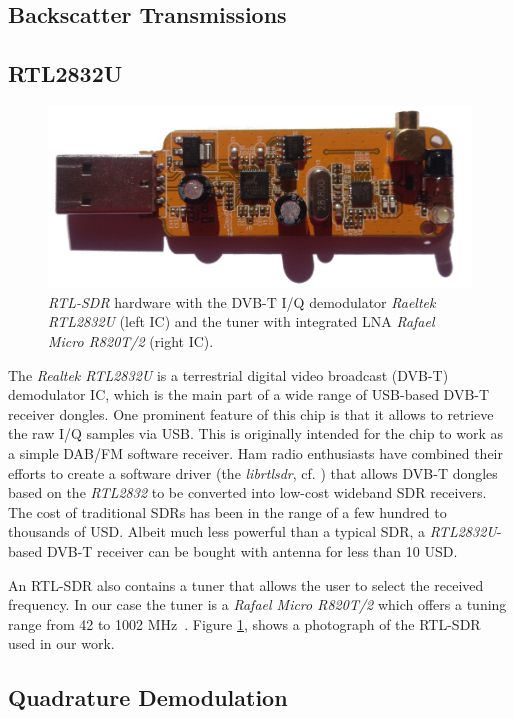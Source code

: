 \documentclass[conference]{IEEEtran}
\begin{document}
\subsection{Backscatter Transmissions}


\subsection{RTL2832U}
\label{sub:rtl2832}

\begin{figure}[h]
				\centering
				\includegraphics[width=0.5\columnwidth]{./fig/rtlsdr.jpg}
				\caption{\textit{RTL-SDR} hardware with the DVB-T I/Q
				demodulator \textit{Raeltek RTL2832U} (left IC) and the tuner
				with integrated LNA \textit{Rafael Micro R820T/2} (right IC).} 
				\label{fig:receiver_arch}
\end{figure}
The \textit{Realtek RTL2832U} is a terrestrial digital video broadcast
(DVB-T) demodulator IC, which is the main part of a wide range of
USB-based DVB-T receiver dongles. One prominent feature of this chip is
that it allows to retrieve the raw I/Q samples via USB. This is
originally intended for the chip to work as a simple DAB/FM software
receiver. Ham radio enthusiasts have combined their efforts to create a
software driver (the \textit{librtlsdr}, cf. \cite{steve-m_librtlsdr})
that allows DVB-T dongles based on the \textit{RTL2832} to be converted
into low-cost wideband SDR receivers. The cost of traditional SDRs has
been in the range of a few hundred to thousands of USD. Albeit much less
powerful than a typical SDR, a \textit{RTL2832U}-based DVB-T receiver
can be bought with antenna for less than 10 USD.  

An RTL-SDR also contains a tuner that allows the user to select the
received frequency.  In our case the tuner is a \textit{Rafael Micro
R820T/2} which offers a tuning range from 42 to 1002
MHz~\cite{rafael_r820t_2011}. Figure \ref{fig:receiver_arch}, shows a
photograph of the RTL-SDR used in our work. 

\subsection{Quadrature Demodulation}
\end{document}

